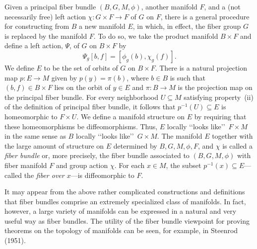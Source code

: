 Given a principal fiber bundle \((B,G,M,\phi)\), another manifold \(F\), and a (not
necessarily free) left action \(\chi:G\times F\longrightarrow F\) of \(G\) on
\(F\), there is a general procedure for constructing from \(B\) a new manifold
\(E\), in which, in effect, the fiber group \(G\) is replaced by the manifold \(F\).
To do so, we take the product manifold \(B\times F\) and define a left action,
\(\Psi\), of \(G\) on \(B\times F\) by
\begin{equation}
  \Psi_g[b,f]=[\phi_g(b),\chi_g(f)].
  \tag{13.2.4}\label{eq:13.2.4}
\end{equation}
We define \(E\) to be the set of orbits of \(G\) on \(B\times F\). There is a
natural projection map \(p:E\longrightarrow M\) given by \(p(y)=\pi(b)\), where
\(b\in B\) is such that \((b,f)\in B\times F\) lies on the orbit of \(y\in E\) and
\(\pi:B\longrightarrow M\) is the projection map on the principal fiber bundle. For
every neighborhood \(U\subseteq M\) satisfying property~(ii) of the definition of
principal fiber bundle, it follows that \(p^{-1}(U)\subseteq E\) is homeomorphic to
\(F\times U\). We define a manifold structure on \(E\) by requiring that these
homeomorphisms be diffeomorphisms. Thus, \(E\) locally \lq\lq looks like\rq\rq\
\(F\times M\) in the same sense as \(B\) locally \lq\lq looks like\rq\rq\
\(G\times M\). The manifold \(E\) together with the large amount of structure on
\(E\) determined by \(B,G,M,\phi,F\), and \(\chi\) is called a \emph{fiber bundle}
or, more precisely, the fiber bundle associated to \((B,G,M,\phi)\) with fiber
manifold \(F\) and group action \(\chi\). For each \(x\in M\), the subset
\(p^{-1}(x)\subseteq E\)---called the \emph{fiber over \(x\)}---is diffeomorphic to
\(F\).

It may appear from the above rather complicated constructions and definitions that
fiber bundles comprise an extremely specialized class of manifolds. In fact,
however, a large variety of manifolds can be expressed in a natural and very useful
way as fiber bundles. The utility of the fiber bundle viewpoint for proving theorems
on the topology of manifolds can be seen, for example, in Steenrod (1951).

